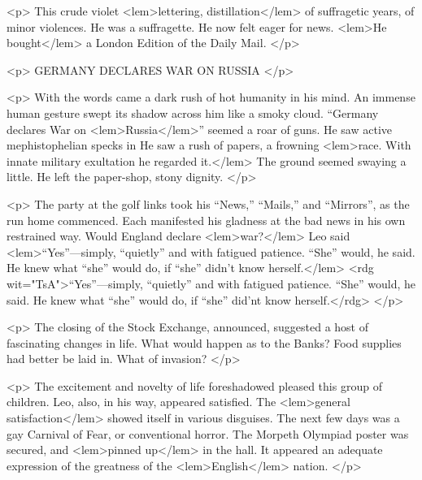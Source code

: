 				<p>
					This crude violet 
<lem>lettering, distillation</lem>
						{} 
					of suffragetic years, of minor violences. He 
					was a suffragette. He now felt eager for news. 
<lem>He bought</lem>
						{} 
					a London Edition of the Daily 
					Mail. 
 				</p>

				<p>
					\vspace{10pt}
					\Large{GERMANY DECLARES WAR ON RUSSIA}
				</p>

				<p>
					\vspace{10pt}
					With the words came a dark rush of hot humanity in his mind. An immense human gesture 
					swept its shadow across him like a smoky cloud. “Germany declares War on 
<lem>Russia</lem>{}” 
					seemed a roar of guns. He saw active mephistophelian specks in 
						{}
					He saw a rush of papers, a frowning 
<lem>race. With innate military exultation he regarded it.</lem>
						{}  
					The ground seemed swaying a little. He left the paper-shop, 
						{} 
					stony dignity. 
 				</p>

				<p>
					The party at the golf links took his “News,” “Mails,” and “Mirrors”, as the run home 
					commenced. Each manifested his gladness at the bad news in his own restrained way. 
					Would England declare 
<lem>war?</lem>{} Leo said  
<lem>“Yes”---simply, “quietly” and with fatigued patience. “She” would, he said. He knew what “she” would do, if “she” 
didn't know herself.</lem>
<rdg wit="TsA">“Yes”---simply, “quietly” and with fatigued patience. “She” would, he said. He knew what “she” would do, if “she” 
did'nt know herself.</rdg>
						{} 
 				</p>

				<p>
					The closing of the Stock Exchange, announced, suggested a host of fascinating changes 
					in life. What would happen as to the Banks? Food supplies had better be laid in. 
					What of invasion? 
 				</p>

				<p>
					The excitement and novelty of life foreshadowed pleased this group of children. Leo, 
					also, in his way, appeared satisfied. The  
<lem>general satisfaction</lem>{} showed itself in various 
					disguises. The next few days was a gay Carnival of Fear, or conventional horror. 
					The Morpeth Olympiad poster was secured, and 
<lem>pinned up</lem>{} in the hall. It appeared an 
					adequate expression of the greatness of the 
<lem>English</lem>{} nation. 
 				</p>

